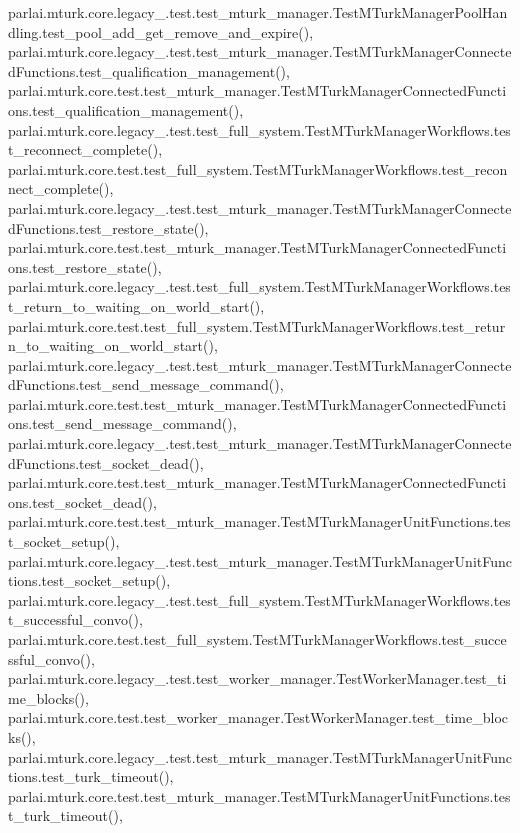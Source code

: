 parlai.\+mturk.\+core.\+legacy\+\_.\+test.\+test\+\_\+mturk\+\_\+manager.\+Test\+M\+Turk\+Manager\+Pool\+Handling.\+test\+\_\+pool\+\_\+add\+\_\+get\+\_\+remove\+\_\+and\+\_\+expire(), parlai.\+mturk.\+core.\+legacy\+\_.\+test.\+test\+\_\+mturk\+\_\+manager.\+Test\+M\+Turk\+Manager\+Connected\+Functions.\+test\+\_\+qualification\+\_\+management(), parlai.\+mturk.\+core.\+test.\+test\+\_\+mturk\+\_\+manager.\+Test\+M\+Turk\+Manager\+Connected\+Functions.\+test\+\_\+qualification\+\_\+management(), parlai.\+mturk.\+core.\+legacy\+\_.\+test.\+test\+\_\+full\+\_\+system.\+Test\+M\+Turk\+Manager\+Workflows.\+test\+\_\+reconnect\+\_\+complete(), parlai.\+mturk.\+core.\+test.\+test\+\_\+full\+\_\+system.\+Test\+M\+Turk\+Manager\+Workflows.\+test\+\_\+reconnect\+\_\+complete(), parlai.\+mturk.\+core.\+legacy\+\_.\+test.\+test\+\_\+mturk\+\_\+manager.\+Test\+M\+Turk\+Manager\+Connected\+Functions.\+test\+\_\+restore\+\_\+state(), parlai.\+mturk.\+core.\+test.\+test\+\_\+mturk\+\_\+manager.\+Test\+M\+Turk\+Manager\+Connected\+Functions.\+test\+\_\+restore\+\_\+state(), parlai.\+mturk.\+core.\+legacy\+\_.\+test.\+test\+\_\+full\+\_\+system.\+Test\+M\+Turk\+Manager\+Workflows.\+test\+\_\+return\+\_\+to\+\_\+waiting\+\_\+on\+\_\+world\+\_\+start(), parlai.\+mturk.\+core.\+test.\+test\+\_\+full\+\_\+system.\+Test\+M\+Turk\+Manager\+Workflows.\+test\+\_\+return\+\_\+to\+\_\+waiting\+\_\+on\+\_\+world\+\_\+start(), parlai.\+mturk.\+core.\+legacy\+\_.\+test.\+test\+\_\+mturk\+\_\+manager.\+Test\+M\+Turk\+Manager\+Connected\+Functions.\+test\+\_\+send\+\_\+message\+\_\+command(), parlai.\+mturk.\+core.\+test.\+test\+\_\+mturk\+\_\+manager.\+Test\+M\+Turk\+Manager\+Connected\+Functions.\+test\+\_\+send\+\_\+message\+\_\+command(), parlai.\+mturk.\+core.\+legacy\+\_.\+test.\+test\+\_\+mturk\+\_\+manager.\+Test\+M\+Turk\+Manager\+Connected\+Functions.\+test\+\_\+socket\+\_\+dead(), parlai.\+mturk.\+core.\+test.\+test\+\_\+mturk\+\_\+manager.\+Test\+M\+Turk\+Manager\+Connected\+Functions.\+test\+\_\+socket\+\_\+dead(), parlai.\+mturk.\+core.\+test.\+test\+\_\+mturk\+\_\+manager.\+Test\+M\+Turk\+Manager\+Unit\+Functions.\+test\+\_\+socket\+\_\+setup(), parlai.\+mturk.\+core.\+legacy\+\_.\+test.\+test\+\_\+mturk\+\_\+manager.\+Test\+M\+Turk\+Manager\+Unit\+Functions.\+test\+\_\+socket\+\_\+setup(), parlai.\+mturk.\+core.\+legacy\+\_.\+test.\+test\+\_\+full\+\_\+system.\+Test\+M\+Turk\+Manager\+Workflows.\+test\+\_\+successful\+\_\+convo(), parlai.\+mturk.\+core.\+test.\+test\+\_\+full\+\_\+system.\+Test\+M\+Turk\+Manager\+Workflows.\+test\+\_\+successful\+\_\+convo(), parlai.\+mturk.\+core.\+legacy\+\_.\+test.\+test\+\_\+worker\+\_\+manager.\+Test\+Worker\+Manager.\+test\+\_\+time\+\_\+blocks(), parlai.\+mturk.\+core.\+test.\+test\+\_\+worker\+\_\+manager.\+Test\+Worker\+Manager.\+test\+\_\+time\+\_\+blocks(), parlai.\+mturk.\+core.\+legacy\+\_.\+test.\+test\+\_\+mturk\+\_\+manager.\+Test\+M\+Turk\+Manager\+Unit\+Functions.\+test\+\_\+turk\+\_\+timeout(), parlai.\+mturk.\+core.\+test.\+test\+\_\+mturk\+\_\+manager.\+Test\+M\+Turk\+Manager\+Unit\+Functions.\+test\+\_\+turk\+\_\+timeout(), 